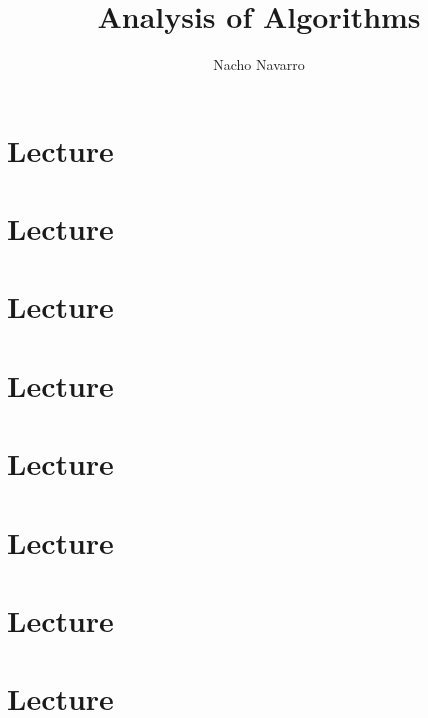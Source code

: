 \documentclass{easyclass}
\begin{document}
\begin{titlepage}
    \title{Analysis of Algorithms}
    \author{Nacho Navarro}
    \maketitle
\end{titlepage}

\tableofcontents

\chapter{Lecture}


\chapter{Lecture}


\chapter{Lecture}


\chapter{Lecture}


\chapter{Lecture}


\chapter{Lecture}


\chapter{Lecture}


\chapter{Lecture}

\end{document}
